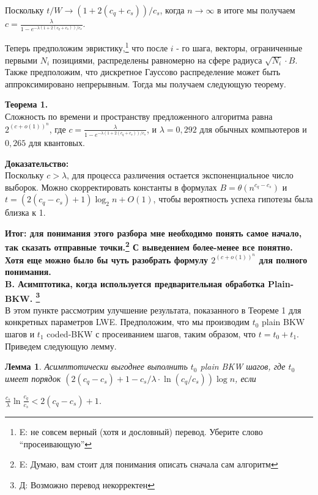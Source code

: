 \documentclass[a4paper,11pt]{article}
\newtheorem{lemma}[theorem]{Лемма}
\begin{document}
Поскольку $t/W \rightarrow (1+2(c_q + c_s))/c_s$, когда $n \rightarrow \infty$ в итоге мы получаем $c=\frac{\lambda}{1-e^{- \lambda(1+2(c_q + c_s))/c_s}}$.

Теперь предположим эвристику,\footnote{E: не совсем верный (хотя и дословный) перевод. Уберите слово ``просеивающую''} что после $i$ - го шага, векторы, ограниченные первыми $N_i$ позициями, распределены равномерно на сфере радиуса $\sqrt{N_i}\cdot B$. Также предположим, что дискретное Гауссово распределение может быть аппроксимировано непрерывным. Тогда мы получаем следующую теорему.

\textbf{Теорема 1.}\\
Сложность по времени и пространству предложенного алгоритма равна $2^{(c+o(1))^n}$, где $c=\frac{\lambda}{1-e^{- \lambda(1+2(c_q + c_s))/c_s}}$, и $\lambda = 0,292$ для обычных компьютеров и $0,265$ для квантовых.

\textbf{Доказательство:}\\
Поскольку $c> \lambda$, для процесса различения остается экспоненциальное число выборок. Можно скорректировать константы в формулах $B=\theta(n^{c_q-c_s})$ и $t=(2(c_q-c_s)+1)\log_2 n + O(1)$, чтобы вероятность успеха гипотезы была близка к 1.

\textbf{Итог: для понимания этого разбора мне необходимо понять самое начало, так сказать отправные точки.\footnote{E: Думаю, вам стоит для понимания описать сначала сам алгоритм} С выведением более-менее все понятно. Хотя еще можно было бы чуть разобрать формулу $2^{(c+o(1))^n}$ для полного понимания.}\\

\textbf {B. Асимптотика, когда используется предварительная обработка Plain-BKW. \footnote{Д: Возможно перевод некорректен}}\\

В этом пункте рассмотрим улучшение результата, показанного в Теореме 1 для конкретных параметров LWE. Предположим, что мы производим $t_0$ plain BKW шагов и $t_1$ coded-BKW с просеиванием шагов, таким образом, что $t=t_0+t_1$. Приведем следующую лемму.

\begin{lemma}
Асимптотически выгоднее выполнить $t_0$ plain BKW шагов, где $t_0$ имеет порядок $(2(c_q - c_s)+1-c_s/\lambda \cdot \ln{(c_q/c_s)}) \log{n}$, если\\
\begin{center}
$\frac{c_s}{\lambda}\ln{\frac{c_q}{c_s}} < 2(c_q - c_s) + 1$.
\end{center}
\end{lemma}
\end{document}
